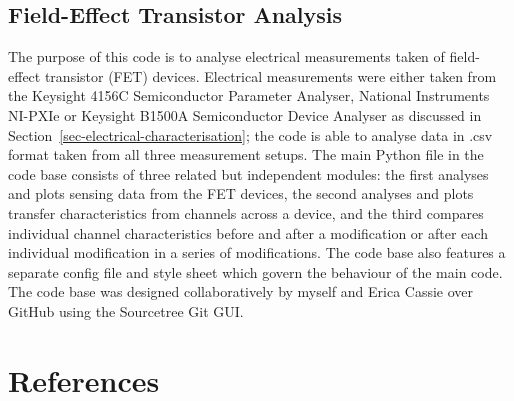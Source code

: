 \documentclass[
  a4paper,
]{scrbook}
\begin{document}
\hypertarget{sec-field-effect-transistor-analysis}{%
\section{Field-Effect Transistor
Analysis}\label{sec-field-effect-transistor-analysis}}

The purpose of this code is to analyse electrical measurements taken of
field-effect transistor (FET) devices. Electrical measurements were
either taken from the Keysight 4156C Semiconductor Parameter Analyser,
National Instruments NI-PXIe or Keysight B1500A Semiconductor Device
Analyser as discussed in Section~\ref{sec-electrical-characterisation};
the code is able to analyse data in .csv format taken from all three
measurement setups. The main Python file in the code base consists of
three related but independent modules: the first analyses and plots
sensing data from the FET devices, the second analyses and plots
transfer characteristics from channels across a device, and the third
compares individual channel characteristics before and after a
modification or after each individual modification in a series of
modifications. The code base also features a separate config file and
style sheet which govern the behaviour of the main code. The code base
was designed collaboratively by myself and Erica Cassie over GitHub
using the Sourcetree Git GUI.

\hypertarget{references}{%
\chapter*{References}\label{references}}


\printbibliography[heading=none]


\backmatter
\end{document}

